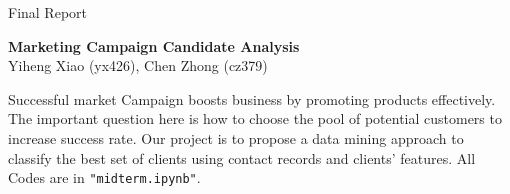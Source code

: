 \documentclass{mytemplate}%
\begin{document}
\baselineskip=14pt  %
\setlength{\columnsep}{22pt}


\renewcommand{\thefootnote}{\fnsymbol{footnote}}



\vspace{0.5cm}

\begin{flushleft}
{ \heiti Final Report}
\end{flushleft}
\vspace{1cm}
\begin{center}
{  \textbf{Marketing Campaign Candidate Analysis}}\\
\vspace{0.2cm}
{Yiheng Xiao (yx426), Chen Zhong (cz379)}
\end{center}
\vspace{0.5cm}
\begin{enabstract}
 Successful market Campaign boosts business by promoting products effectively. The important question here is how to choose the pool of potential customers to increase success rate. Our project is to propose a data mining approach to classify the best set of clients using contact records and clients' features. All Codes are in {\color{green}\texttt{"midterm.ipynb"}}.
\end{enabstract}
\vspace*{2em}
\end{document}
